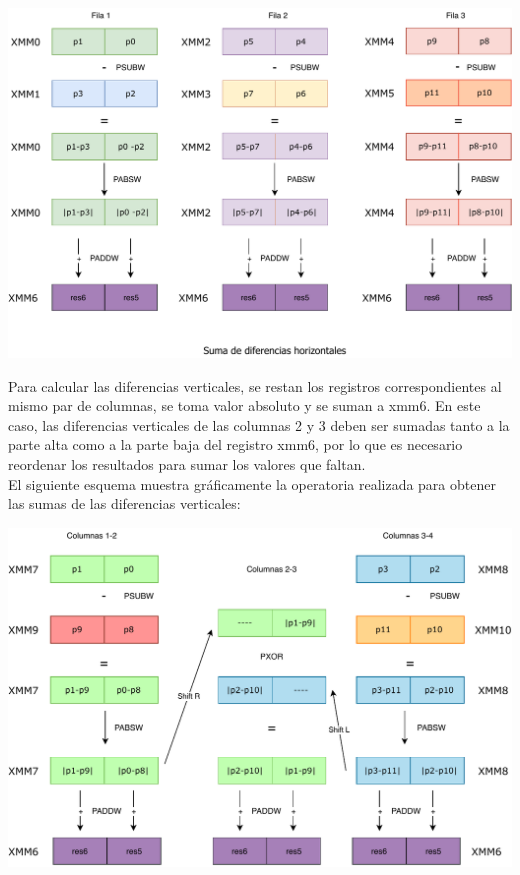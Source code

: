 \documentclass[a4paper]{article}
\begin{document}
\begin{itemize}
	\begin{center}
		\includegraphics[scale=0.6]{img/sumHorizontalColorBordes.pdf}
	\end{center}

	Para calcular las diferencias verticales, se restan los registros correspondientes al mismo par de columnas, se toma valor absoluto y se suman a xmm6. En este caso, las diferencias verticales de las columnas 2 y 3 deben ser sumadas tanto a la parte alta como a la parte baja del registro xmm6, por lo que es necesario reordenar los resultados para sumar los valores que faltan. \\
	El siguiente esquema muestra gráficamente la operatoria realizada para obtener las sumas de las diferencias verticales:
	
	\begin{center}
		\includegraphics[scale=0.6]{img/sumVerticalesColorBordes.pdf}
	\end{center}
	   

\end{itemize}
\end{document}
